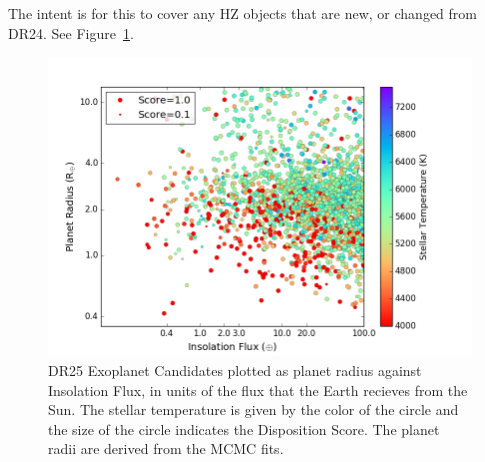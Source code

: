 The intent is for this to cover any HZ objects that are new, or changed from DR24. See Figure~\ref{f:catalogPlot}.

\begin{figure}
    \centering
    \includegraphics[width=1.1\linewidth]{fig-CatalogRadiusInsolScore.png}
    \caption{DR25 Exoplanet Candidates plotted as planet radius against Insolation Flux, in units of the flux that the Earth recieves from the Sun. The stellar temperature is given by the color of the circle and the size of the circle indicates the Disposition Score. The planet radii are derived from the MCMC fits. }
    \label{f:catalogPlot}
\end{figure}